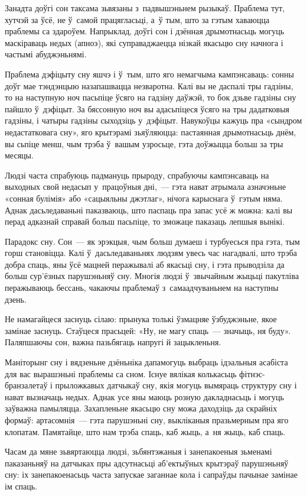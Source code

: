 Занадта доўгі сон таксама зьвязаны з~падвышэньнем рызыкаў. Праблема тут, хутчэй за ўсё, не ў~самой працягласьці, а~ў тым, што за гэтым хаваюцца праблемы са здароўем. Напрыклад, доўгі сон і дзённая дрымотнасьць могуць маскіраваць недых (апноэ), які суправаджаецца нізкай якасьцю сну начнога і частымі абуджэньнямі.

Праблема дэфіцыту сну яшчэ і ў~тым, што яго немагчыма кампэнсаваць: сонны доўг мае тэндэнцыю назапашвацца незваротна. Калі вы не даспалі тры гадзіны, то на наступную ноч пасьпіце ўсяго на гадзіну даўжэй, то бок дзьве гадзіны сну пайшло ў~дэфіцыт. За бяссонную ноч вы адасьпіцеся ўсяго на тры дадатковыя гадзіны, і чатыры гадзіны сыходзіць у~дэфіцыт. Навукоўцы кажуць пра «сындром недастатковага сну», яго крытэрамі зьяўляюцца: пастаянная дрымотнасьць днём, вы сьпіце менш, чым трэба ў~вашым узросьце, гэта доўжыцца больш за тры месяцы.

Людзі часта спрабуюць падмануць прыроду, спрабуючы кампэнсаваць на выходных свой недасып у~працоўныя дні,~--- гэта нават атрымала азначэньне «сонная булімія» або «сацыяльны джэтлаг», нічога карыснага ў~гэтым няма. Аднак дасьледаваньні паказваюць, што паспаць пра запас усё ж можна: калі вы перад адказнай справай больш пасьпіце, то зможаце паказаць лепшыя вынікі.

Парадокс сну. Сон~--- як эрэкцыя, чым больш думаеш і турбуесься пра гэта, тым горш становіцца. Калі ў~дасьледаваньнях людзям увесь час нагадвалі, што трэба добра спаць, яны ўсё мацней перажывалі аб якасьці сну, і гэта прыводзіла да больш сур'ёзных парушэньняў сну. Многія людзі ў~звычайным жыцьці пакутліва перажываюць бессань, чакаючы праблемаў з~самаадчуваньнем на наступны дзень.

Не намагайцеся заснуць сілаю: прынука толькі ўзмацняе ўзбуджэньне, якое замінае заснуць. Стаўцеся прасьцей: «Ну, не магу спаць~--- значыць, ня буду». Паляпшаючы сон, важна пазьбягаць напругі й зацыкленьня.

Маніторынг сну і вядзеньне дзёньніка дапамогуць выбраць ідэальныя асабіста для вас вырашэньні праблемы са сном. Існуе вялікая колькасьць фітнэс-бранзалетаў і прыложкавых датчыкаў сну, якія могуць вымяраць структуру сну і нават вызначаць недых. Аднак усе яны маюць розную дакладнасьць і могуць заўважна памыляцца. Захапленьне якасьцю сну можа даходзіць да скрайніх формаў: артасомнія~--- гэта парушэньні сну, выкліканыя празьмерным пра яго клопатам. Памятайце, што нам трэба спаць, каб жыць, а~ня жыць, каб спаць.

Часам да мяне зьвяртаюцца людзі, зьбянтэжаныя і занепакоеныя зьменамі паказаньняў на датчыках пры адсутнасьці аб'ектыўных крытэраў парушэньняў сну: іх занепакоенасьць часта запускае заганнае кола і сапраўды пачынае замінае ім спаць.


